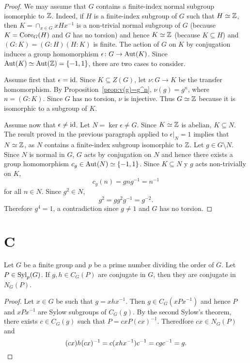 \begin{proof}
	We may assume that $G$ contains a finite-index normal subgroup isomorphic to $\mathbb{Z}$. Indeed, 
	if $H$ is a finite-index subgroup of $G$ such that $H\simeq\mathbb{Z}$, then 
	$K=\cap_{x\in G}xHx^{-1}$ is a non-trivial normal subgroup of $G$ (because $K=\operatorname{Core}_G(H)$ and 
	$G$ has no torsion) and hence $K\simeq\mathbb{Z}$ (because  
	$K\subseteq H$) and $(G:K)=(G:H)(H:K)$ is finite.
	The action of $G$ on $K$ by conjugation induces a group homomorphism  
	$\epsilon\colon G\to\operatorname{Aut}(K)$. Since $\operatorname{Aut}(K)\simeq\operatorname{Aut}(\mathbb{Z})=\{-1,1\}$, 
	there are two cases to consider.
	
	Assume first that $\epsilon=\operatorname{id}$. Since $K\subseteq Z(G)$, let
	$\nu\colon G\to K$ be the transfer homomorphism. By
	Proposition~\ref{prop:v(g)=g^n}, $\nu(g)=g^n$, where $n=(G:K)$. Since
	$G$ has no torsion, $\nu$ is injective. Thus
	$G\simeq\mathbb{Z}$ because it is isomorphic to a subgroup of $K$.

	Assume now that $\epsilon\ne\operatorname{id}$. Let $N=\ker\epsilon\ne G$. Since
	$K\simeq\mathbb{Z}$ is abelian, $K\subseteq N$. The result proved in the previous paragraph 
	applied to $\epsilon|_N=1$ implies that $N\simeq\mathbb{Z}$, as 
	$N$ contains a finite-index subgroup isomorphic to $\mathbb{Z}$. Let $g\in G\setminus N$. 
	Since $N$ is normal in $G$, $G$ acts by conjugation on $N$ and hence 
	there exists a group homomorphism $c_g\in\operatorname{Aut}(N)\simeq\{-1,1\}$. Since
	$K\subseteq N$ y $g$ acts non-trivially on $K$, 
	\[
	c_g(n)=gng^{-1}=n^{-1}
	\]
	for all $n\in N$.  Since 
	$g^2\in N$, 
	\[
		g^2=gg^2g^{-1}=g^{-2}.
	\]
	Therefore $g^4=1$, a contradiction since $g\ne1$ and $G$ has no torsion.\end{proof}



\section*{C}

\begin{lemma}
	\label{lem:normal_complement}
	Let $G$ be a finite group and $p$ be a prime number dividing the order of $G$. Let
	$P\in\mathrm{Syl}_p(G)$. If $g,h\in C_G(P)$ are conjugate in $G$, then they are
	conjugate in $N_G(P)$.
\end{lemma}

\begin{proof}
	Let $x\in G$ be such that $g=xhx^{-1}$. Then $g\in C_G(xPx^{-1})$ and hence $P$
	and $xPx^{-1}$ are Sylow subgroups of $C_G(g)$. By the second Sylow's theorem, 
	there exists 
	$c\in C_G(g)$ such that $P=cxP(cx)^{-1}$. Theredfore $cx\in N_G(P)$ and
	\[
	(cx)h(cx)^{-1}=c(xhx^{-1})c^{-1}=cgc^{-1}=g.\qedhere
	\]
\end{proof}

